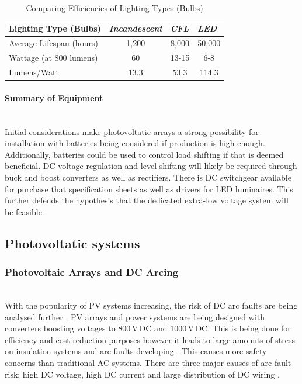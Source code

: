 \begin{table}[!ht]
	\centering
	\renewcommand{\arraystretch}{2} %
	\begin{tabular}{|l|c|c|c|}
		\hline
		\textbf{Lighting Type (Bulbs)} & \multicolumn{1}{l|}{\textit{Incandescent}} & \multicolumn{1}{l|}{\textit{CFL}} & \multicolumn{1}{l|}{\textit{LED}} \\ \hline
		Average Lifespan (hours) & 1,200 & 8,000 & 50,000 \\ \hline
		Wattage (at 800 lumens) & 60 & 13-15 & 6-8 \\ \hline
		Lumens/Watt & 13.3 & 53.3 & 114.3 \\ \hline
	\end{tabular} \quad
	\caption{Comparing Efficiencies of Lighting Types (Bulbs) \cite{Koh2011}}
	\label{LightingTypes}
\end{table}

\paragraph{Summary of Equipment}
~\\
Initial considerations make photovoltatic arrays a strong possibility for installation with batteries being considered if production is high enough. Additionally, batteries could be used to control load shifting if that is deemed beneficial. DC voltage regulation and level shifting will likely be required through buck and boost converters as well as rectifiers. There is DC switchgear available for purchase that specification sheets as well as drivers for LED luminaires. This further defends the hypothesis that the dedicated  extra-low voltage system will be feasible. 

\subsection{Photovoltatic systems}

\subsubsection{Photovoltaic Arrays and DC Arcing}
~\\
With the popularity of PV systems increasing, the risk of DC arc faults are being analysed further \cite{Spooner2008}. PV arrays and power systems are being designed with converters boosting voltages to 800\,V\,DC and 1000\,V\,DC. This is being done for efficiency and cost reduction purposes however it leads to large amounts of stress on insulation systems and arc faults developing \cite{Spooner2008}. This causes more safety concerns than traditional AC systems. There are three major causes of arc fault risk; high DC voltage, high DC current and large distribution of DC wiring \cite{website:DC-Arching}.
\newline

